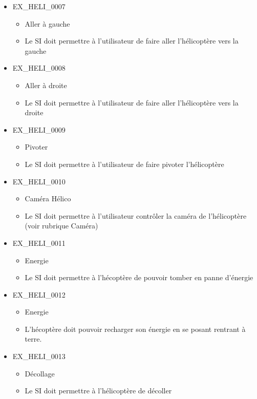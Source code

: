 \documentclass[12pt,a4paper]{scrartcl}
\begin{document}
\begin{itemize}
\item EX\_HELI\_0007
\begin{itemize}
\item Aller à gauche
\item Le SI doit permettre à l'utilisateur de faire aller l'hélicoptère vers la gauche
\end{itemize}

\item EX\_HELI\_0008
\begin{itemize}
\item Aller à droite
\item Le SI doit permettre à l'utilisateur de faire aller l'hélicoptère vers la droite
\end{itemize}

\item EX\_HELI\_0009
\begin{itemize}
\item Pivoter
\item Le SI doit permettre à l'utilisateur de faire pivoter l'hélicoptère
\end{itemize}

\item EX\_HELI\_0010
\begin{itemize}
\item Caméra Hélico
\item Le SI doit permettre à l'utilisateur contrôler la caméra de l'hélicoptère (voir rubrique Caméra)
\end{itemize}

\item EX\_HELI\_0011
\begin{itemize}
\item Energie
\item Le SI doit permettre à l'hécoptère de pouvoir tomber en panne d'énergie
\end{itemize}

\item EX\_HELI\_0012
\begin{itemize}
\item Energie
\item L'hécoptère doit pouvoir recharger son énergie en se posant rentrant à terre.
\end{itemize}

\item EX\_HELI\_0013
\begin{itemize}
\item Décollage
\item Le SI doit permettre à l'hélicoptère de décoller
\end{itemize}


\end{itemize}
\end{document}
